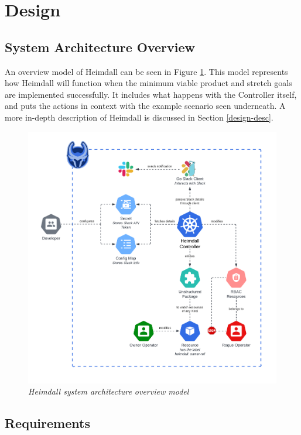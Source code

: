 \documentclass{article}
\begin{document}
\newpage

\section{Design}

\subsection{System Architecture Overview}

An overview model of Heimdall can be seen in Figure \ref{arch-diag}. This model represents how Heimdall will function when the minimum viable product and stretch goals are implemented successfully. It includes what happens with the Controller itself, and puts the actions in context with the example scenario seen underneath. A more in-depth description of Heimdall is discussed in Section \ref{design-desc}.

\begin{figure}[H]
    \centering
    \includegraphics[width=160mm]{design/arch-diag.png}
    \caption{\emph{Heimdall system architecture overview model}}
    \label{arch-diag}
\end{figure}



\subsection{Requirements}
\end{document}
